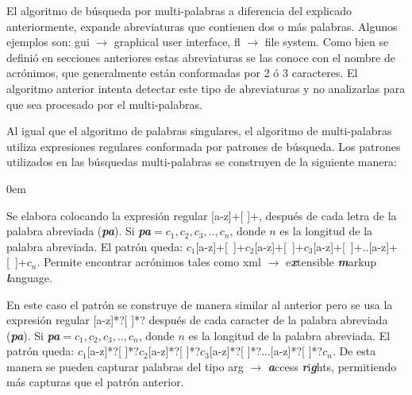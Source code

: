 \documentclass[a4paper,12pt]{report}
\begin{document}
El algoritmo de búsqueda por multi-palabras a diferencia del explicado anteriormente, expande abreviaturas que contienen dos o más palabras. Algunos ejemplos son: \textsf{gui $\rightarrow$ graphical user interface, fl $\rightarrow$ file system}. Como bien se definió en secciones anteriores estas abreviaturas se las conoce con el nombre de acrónimos, que generalmente están conformadas por 2 ó 3 caracteres. El algoritmo anterior intenta detectar este tipo de abreviaturas y no analizarlas para que sea procesado por el multi-palabras.

Al igual que el algoritmo de palabras singulares, el algoritmo de multi-palabras utiliza expresiones regulares conformada por patrones de búsqueda. Los patrones utilizados en las búsquedas multi-palabras se construyen de la siguiente manera:






\begin{description}
\itemsep0em%
\item[Patrón acrónimo:] Se elabora colocando la expresión regular [a-z]+[ ]+, después de cada letra de la palabra abreviada (\textit{\textbf{pa}}). Si \textit{\textbf{pa}}$=c_{1},c_{2},c_{3},..,c_{n}$, donde $n$ es la longitud de la palabra abreviada. El patrón queda: \mbox{$c_{1}$[a-z]+[ ]+$c_{2}$[a-z]+[ ]+$c_{3}$[a-z]+[ ]+..[a-z]+[ ]+$c_{n}$}. Permite encontrar acrónimos tales como \textsf{xml} $\rightarrow$ e\textbf{\textit{x}}tensible \textbf{\textit{m}}arkup \textbf{\textit{l}}anguage.

\item[Patrón de Combinación de Palabras:] En este caso el patrón se construye de manera similar al anterior pero se usa la expresión regular [a-z]*?[ ]*? después de cada caracter de la palabra abreviada (\textit{\textbf{pa}}). Si \textit{\textbf{pa}}$=c_{1},c_{2},c_{3},..,c_{n}$, donde $n$ es la longitud de la palabra abreviada. El patrón queda: $c_{1}$[a-z]*?[ ]*?$c_{2}$[a-z]*?[ ]*?$c_{3}$[a-z]*?[ ]*?...[a-z]*?[ ]*?$c_{n}$. De esta manera se pueden capturar palabras del tipo \textsf{arg} $\rightarrow$ \textbf{\textit{a}}ccess \textbf{\textit{r}}i\textbf{\textit{g}}hts, permitiendo más capturas que el patrón anterior.
\end{description}
\end{document}
